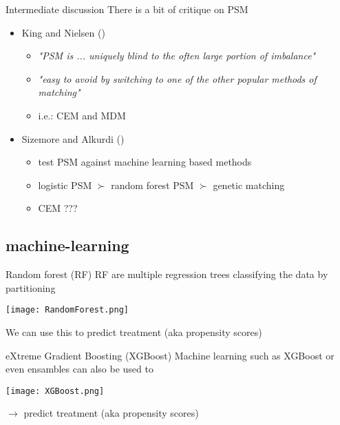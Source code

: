\documentclass[aspectratio=169]{beamer}
\begin{document}
		\begin{frame}{Intermediate discussion}
			There is a bit of critique on PSM
			\begin{itemize}
				\item King and Nielsen (\citeyear{King2019})
				\begin{itemize}
					\item \textit{"PSM is ... uniquely blind to the often large portion of imbalance"}
					\item \textit{"easy to avoid by switching to one of the other popular methods of matching"}
					\item i.e.: CEM and MDM
				\end{itemize}
				\item Sizemore and Alkurdi (\citeyear{Sizemore2019})
				\begin{itemize}
					\item test PSM against machine learning based methods
					\item logistic PSM $\succ$ random forest PSM  $\succ$ genetic matching
					\item CEM ???
				\end{itemize}
			\end{itemize}
		\end{frame}

	\subsection{machine-learning}
		\begin{frame}{Random forest (RF)}
			RF are multiple regression trees classifying the data by partitioning
			\begin{center}
				\texttt{[image: RandomForest.png]}
			\end{center}
			We can use this to predict treatment (aka propensity scores)
		\end{frame}

		\begin{frame}{eXtreme Gradient Boosting (XGBoost)}
			Machine learning such as XGBoost or even ensambles can also be used to
			\begin{center}
				\texttt{[image: XGBoost.png]}
			\end{center}
			$\rightarrow$ predict treatment (aka propensity scores)
		\end{frame}
\end{document}
